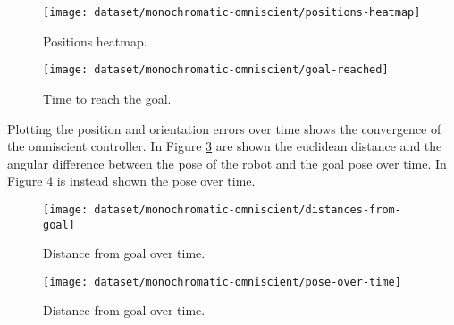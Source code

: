 \begin{figure}[htbp]
\centerline{\texttt{[image: dataset/monochromatic-omniscient/positions-heatmap]}}
	\caption{Positions heatmap.}
	\label{fig:densisy-omniscient}
\end{figure}


\begin{figure}[htbp]
\centerline{\texttt{[image: dataset/monochromatic-omniscient/goal-reached]}}
	\caption{Time to reach the goal.}
	\label{fig:goal-reached-omniscient}
\end{figure}

Plotting the position and orientation errors over time shows the convergence of 
the omniscient controller. In Figure \ref{fig:distance-from-goal-omniscient} 
are shown the euclidean distance and the angular difference between the pose of 
the robot and the goal pose over time. In Figure \ref{fig:pose-over-time} is 
instead shown the pose over time.

\begin{figure}[htbp]
	
\centerline{\texttt{[image: dataset/monochromatic-omniscient/distances-from-goal]}}
	\caption{Distance from goal over time.}
	\label{fig:distance-from-goal-omniscient}
\end{figure}

\begin{figure}[htbp]
	
\centerline{\texttt{[image: dataset/monochromatic-omniscient/pose-over-time]}}
	\caption{Distance from goal over time.}
	\label{fig:pose-over-time}
\end{figure}
